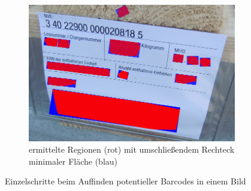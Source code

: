 \begin{figure}[H]
\begin{subfigure}[t]{0.32\columnwidth}
    \includegraphics[width=\columnwidth]{img/techniques/candidate-extraction/candidates}
    \caption{\scriptsize ermittelte Regionen (rot) mit umschließendem Rechteck minimaler Fläche (blau)}
  \end{subfigure}
  \caption[Einzelschritte beim Auffinden potentieller Barcodes]{Einzelschritte beim Auffinden potentieller Barcodes in einem Bild\protect\footnotemark}
\end{figure}


